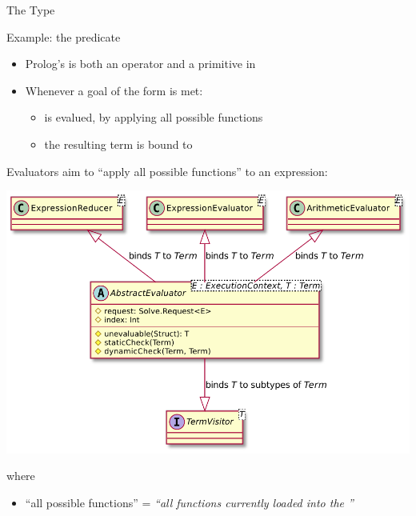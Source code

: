 \documentclass[handout]{beamer}
\begin{document}
\begin{frame}[allowframebreaks]{The  Type}
    \begin{exampleblock}{Example: the  predicate}
        \begin{itemize}
            \item Prolog's  is both an operator and a primitive in \twopkt{}
            \item Whenever a goal of the form  is met:
            \begin{itemize}
                \item {} is \alert{evalued}, by applying \alert{all} possible functions
                \item the resulting term is bound to 
            \end{itemize}
        \end{itemize}
    \end{exampleblock}

    \framebreak

    \alert{Evaluators} aim to ``apply \alert{all possible} functions'' to an expression:
    \begin{center}
        \includegraphics[width=.5\linewidth]{img/evaluator.pdf}
    \end{center}
    \small
    where
    \begin{itemize}
        \item ``all possible functions'' = \emph{``all functions currently loaded into the ''}
    \end{itemize}

    \framebreak


\end{frame}
\end{document}
